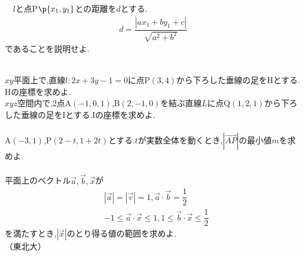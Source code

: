 \documentclass[10pt,fleqn,a4paper]{jsarticle}
\newcommand{\ans}[1]{\mbox{\boldmath{$#1$}}}
\begin{document}
　$l$と点P$\p{x_1,y_1}$との距離を$d$とする.
\begin{align*}
    d=\dfrac{|ax_1+by_1+c|}{\sqrt{a^2+b^2}}
\end{align*}
であることを説明せよ.
\newpage
\begin{center}
    \ans{3章の問題演習}
\end{center}
\noindent\reibanichi\\
\kakkoichi$xy$平面上で,直線$l:2x+3y-1=0$に点P$(3,4)$から下ろした垂線の足をHとする.\\
Hの座標を求めよ.\\
\kakkoni$xyz$空間内で,2点A$(-1,0,1)$,B$(2,-1,0)$を結ぶ直線$L$に点Q$(1,2,1)$から下ろした垂線の足をIとする.Iの座標を求めよ.\\\\
\reibanni A$(-3,1)$,P$(2-t,1+2t)$とする.$t$が実数全体を動くとき,$\left|\Vec{AP}\right|$の最小値$m$を求めよ.\\\\
\reibansan 平面上のベクトル$\vec{a},\vec{b},\vec{x}$が
\begin{align*}
    &|\vec{a}|=|\vec{v}|=1,\vec{a}\cdot\vec{b}=\dfrac{1}{2}\\
    &-1\leq\vec{a}\cdot\vec{x}\leq1,1\leq\vec{b}\cdot\vec{x}\leq\dfrac{1}{2}
\end{align*}
を満たすとき,$|\vec{x}|$のとり得る値の範囲を求めよ.\\
\hspace{10cm}（東北大）
\newpage
\end{document}
